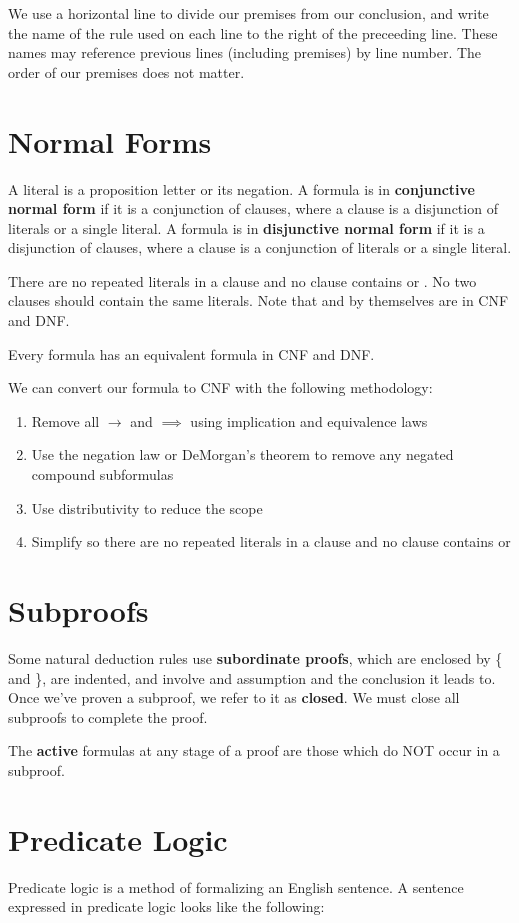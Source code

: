 \documentclass[12pt]{article}
\begin{document}
We use a horizontal line to divide our premises from our conclusion, and write the name of the rule used on each line to the right of the preceeding line. These names may reference previous lines (including premises) by line number. The order of our premises does not matter.

\section*{Normal Forms}
A literal is a proposition letter or its negation. A formula is in {\bf conjunctive normal form} if it is a conjunction of clauses, where a clause is a disjunction of literals or a single literal. A formula is in {\bf disjunctive normal form} if it is a disjunction of clauses, where a clause is a conjunction of literals or a single literal.

There are no repeated literals in a clause and no clause contains \true or \false. No two clauses should contain the same literals. Note that \true and \false by themselves are in CNF and DNF.

Every formula has an equivalent formula in CNF and DNF.

We can convert our formula to CNF with the following methodology:
\begin{enumerate}
\item Remove all $\rightarrow$ and $\implies$ using implication and equivalence laws
\item Use the negation law or DeMorgan's theorem to remove any negated compound subformulas
\item Use distributivity to reduce the scope
\item Simplify so there are no repeated literals in a clause and no clause contains \true or \false
\end{enumerate}

\section*{Subproofs}
Some natural deduction rules use {\bf subordinate proofs}, which are enclosed by \{ and \}, are indented, and involve and assumption and the conclusion it leads to. Once we've proven a subproof, we refer to it as {\bf closed}. We must close all subproofs to complete the proof.

The {\bf active} formulas at any stage of a proof are those which do NOT occur in a subproof.



\section*{Predicate Logic}
Predicate logic is a method of formalizing an English sentence. A sentence expressed in predicate logic looks like the following:
\end{document}
